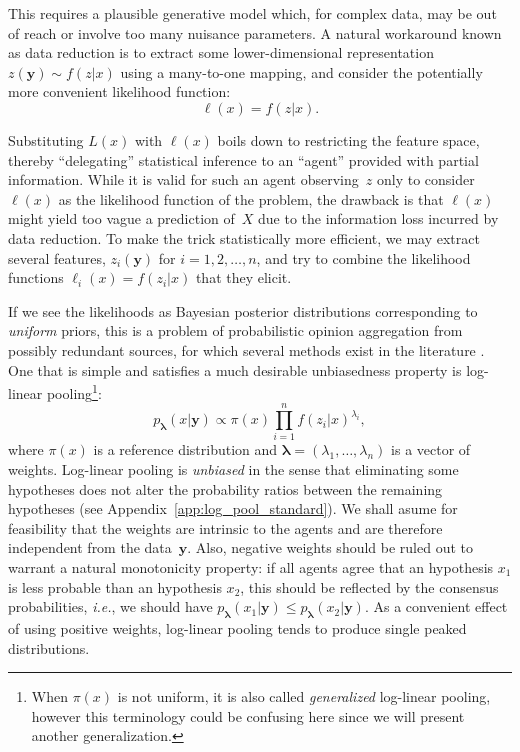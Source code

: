 \documentclass[english]{scrartcl}
\def\y{{\mathbf{y}}}
\newcommand{\blambda}{{\boldsymbol{\lambda}}}
\begin{document}
This requires a plausible generative model which, for complex data, may be out of reach or involve too many nuisance parameters. A natural workaround known as data reduction is to extract some lower-dimensional representation $z(\y)\sim f(z|x)$ using a many-to-one mapping, and consider the potentially more convenient likelihood function:
$$
\ell(x) = f(z|x).
$$

Substituting $L(x)$ with $\ell(x)$ boils down to restricting the feature space, thereby  ``delegating'' statistical inference to an ``agent'' provided with partial information. While it is valid for such an agent observing~$z$ only to consider $\ell(x)$ as the likelihood function of the problem, the drawback is that $\ell(x)$ might yield too vague a prediction of~$X$ due to the information loss incurred by data reduction. To make the trick statistically more efficient, we may extract several features, $z_i(\y)$ for $i=1,2,\ldots,n$, and try to combine the likelihood functions $\ell_i(x) = f(z_i|x)$ that they elicit.

If we see the likelihoods as Bayesian posterior distributions corresponding to {\em uniform} priors, this is a problem of probabilistic opinion aggregation from possibly redundant sources, for which several methods exist in the literature \cite{Tarantola-82,Genest-86,Garg-04,Allard-12}. One that is simple and satisfies a much desirable unbiasedness property is log-linear pooling\footnote{When $\pi(x)$ is not uniform, it is also called {\em generalized} log-linear pooling, however this terminology could be confusing here since we will present another generalization.}:
\begin{equation}
\label{eq:log_pool}
p_\blambda(x|\y) \propto \pi(x) \prod_{i=1}^n f(z_i|x)^{\lambda_i},
\end{equation} 
where $\pi(x)$ is a reference distribution and $\blambda=(\lambda_1,\ldots,\lambda_n)$ is a vector of weights. Log-linear pooling is {\em unbiased} in the sense that eliminating some hypotheses does not alter the probability ratios between the remaining hypotheses (see Appendix~\ref{app:log_pool_standard}). We shall asume for feasibility that the weights are intrinsic to the agents and are therefore independent from the data~$\y$. Also, negative weights should be ruled out to warrant a natural monotonicity property: if all agents agree that an hypothesis $x_1$ is less probable than an hypothesis $x_2$, this should be reflected by the consensus probabilities, {\em i.e.}, we should have $p_\blambda(x_1|\y)\leq p_\blambda(x_2|\y)$. As a convenient effect of using positive weights, log-linear pooling tends to produce single peaked distributions.
\end{document}
